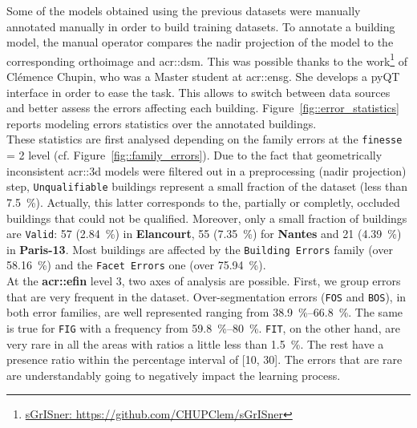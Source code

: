        Some of the models obtained using the previous datasets were manually annotated manually in order to build training datasets.
        To annotate a building model, the manual operator compares the nadir projection of the model to the corresponding orthoimage and \gls{acr::dsm}.
        This was possible thanks to the work\footnote{\href{https://github.com/CHUPClem/sGrISner}{sGrISner: https://github.com/CHUPClem/sGrISner}} of Clémence Chupin, who was a Master student at \gls{acr::ensg}.
        She develops a pyQT interface in order to ease the task.
        This allows to switch between data sources and better assess the errors affecting each building.
        Figure~\ref{fig::error_statistics} reports modeling errors statistics over the annotated buildings.\\

        These statistics are first analysed depending on the family errors at the \texttt{finesse} = 2 level (cf. Figure~\ref{fig::family_errors}).
        Due to the fact that geometrically inconsistent \gls{acr::3d} models were filtered out in a preprocessing (nadir projection) step, \texttt{Unqualifiable} buildings represent a small fraction of the dataset (less than \SI{7.5}{\percent}).
        Actually, this latter corresponds to the, partially or completly, occluded buildings that could not be qualified.
        Moreover, only a small fraction of buildings are \texttt{Valid}:
        57 (\SI{2.84}{\percent}) in \textbf{Elancourt}, 55 (\SI{7.35}{\percent}) for \textbf{Nantes} and 21 (\SI{4.39}{\percent}) in \textbf{Paris-13}.
        Most buildings are affected by the \texttt{Building Errors} family (over \SI{58.16}{\percent}) and the \texttt{Facet Errors} one (over \SI{75.94}{\percent}).\\

        At the \textbf{\gls{acr::efin}} level 3, two axes of analysis are possible.
        First, we group errors that are very frequent in the dataset.
        Over-segmentation errors (\texttt{FOS} and \texttt{BOS}), in both error families, are well represented ranging from \SIrange{38.9}{66.8}{\percent}.
        The same is true for \texttt{FIG} with a frequency from \SIrange{59.8}{80}{\percent}.
        \texttt{FIT}, on the other hand, are very rare in all the areas with ratios a little less than \SI{1.5}{\percent}.
        The rest have a presence ratio within the percentage interval of [10, 30].
        The errors that are rare are understandably going to negatively impact the learning process.\\
        
